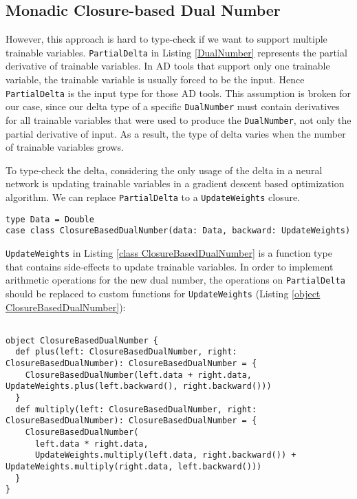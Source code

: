 \subsection{Monadic Closure-based Dual Number}

However, this approach is hard to type-check if we want to support multiple  \glspl{trainable variable}. \lstinline{PartialDelta} in Listing \ref{DualNumber} represents the partial derivative of \glspl{trainable variable}. In AD tools that support only one \gls{trainable variable}, the \gls{trainable variable} is usually forced to be the input. Hence \lstinline{PartialDelta} is the input type for those AD tools. This assumption is broken for our case, since our delta type of a specific \lstinline{DualNumber} must contain derivatives for all \glspl{trainable variable} that were used to produce the \lstinline{DualNumber}, not only the partial derivative of input. As a result, the type of delta varies when the number of \glspl{trainable variable} grows.

To type-check the delta, considering the only usage of the delta in a neural network is updating \glspl{trainable variable} in a gradient descent based optimization algorithm. We can replace \lstinline{PartialDelta} to a \lstinline{UpdateWeights} closure.

\begin{lstlisting}[float={htbp},caption={Replacing \lstinline{PartialDelta} to a closure}, label={class ClosureBasedDualNumber}]
type Data = Double  
case class ClosureBasedDualNumber(data: Data, backward: UpdateWeights)
\end{lstlisting}

\lstinline{UpdateWeights} in Listing \ref{class ClosureBasedDualNumber} is a function type that contains side-effects to update \glspl{trainable variable}. In order to implement arithmetic operations for the new dual number, the operations on \lstinline{PartialDelta} should be replaced to custom functions for \lstinline{UpdateWeights} (Listing \ref{object ClosureBasedDualNumber}):

\begin{lstlisting}[float={htbp},caption={Replacing operations on \lstinline{PartialDelta} to custom functions for \lstinline{UpdateWeights}}, label={object ClosureBasedDualNumber}]  

object ClosureBasedDualNumber {
  def plus(left: ClosureBasedDualNumber, right: ClosureBasedDualNumber): ClosureBasedDualNumber = {
    ClosureBasedDualNumber(left.data + right.data, UpdateWeights.plus(left.backward(), right.backward()))
  }
  def multiply(left: ClosureBasedDualNumber, right: ClosureBasedDualNumber): ClosureBasedDualNumber = {
    ClosureBasedDualNumber(
      left.data * right.data,
      UpdateWeights.multiply(left.data, right.backward()) + UpdateWeights.multiply(right.data, left.backward()))
  }
}
\end{lstlisting}


